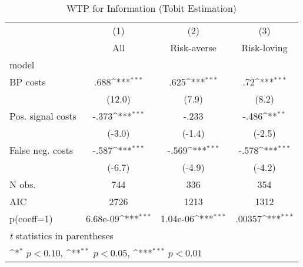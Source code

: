 \begin{table}[htbp]\centering
\def\sym#1{\ifmmode^{#1}\else\(^{#1}\)\fi}
\caption{WTP for Information (Tobit Estimation)}
\begin{tabular}{l*{3}{c}}
\hline\hline
                &\multicolumn{1}{c}{(1)}&\multicolumn{1}{c}{(2)}&\multicolumn{1}{c}{(3)}\\
                &\multicolumn{1}{c}{All}&\multicolumn{1}{c}{Risk-averse}&\multicolumn{1}{c}{Risk-loving}\\
\hline
model           &                  &                  &                  \\
BP costs        &     .688\sym{***}&     .625\sym{***}&      .72\sym{***}\\
                &   (12.0)         &    (7.9)         &    (8.2)         \\
Pos. signal costs&    -.373\sym{***}&    -.233         &    -.486\sym{**} \\
                &   (-3.0)         &   (-1.4)         &   (-2.5)         \\
False neg. costs&    -.587\sym{***}&    -.569\sym{***}&    -.578\sym{***}\\
                &   (-6.7)         &   (-4.9)         &   (-4.2)         \\
\hline
N obs.          &      744         &      336         &      354         \\
AIC             &     2726         &     1213         &     1312         \\
p(coeff=1)      & 6.68e-09\sym{***}& 1.04e-06\sym{***}&   .00357\sym{***}\\
\hline\hline
\multicolumn{4}{l}{\footnotesize \textit{t} statistics in parentheses}\\
\multicolumn{4}{l}{\footnotesize \sym{*} \(p<0.10\), \sym{**} \(p<0.05\), \sym{***} \(p<0.01\)}\\
\end{tabular}
\end{table}
